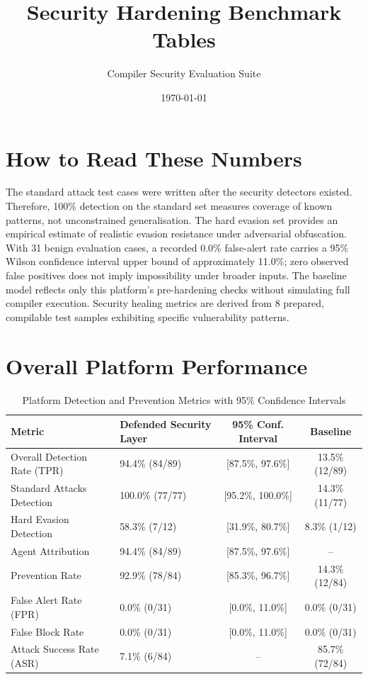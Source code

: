 \documentclass{article}
\title{Security Hardening Benchmark Tables}
\author{Compiler Security Evaluation Suite}
\date{\today}
\begin{document}
\maketitle

\section*{How to Read These Numbers}
\noindent
The standard attack test cases were written after the security detectors existed. Therefore, 100\% detection on the standard set measures coverage of known patterns, not unconstrained generalisation. The hard evasion set provides an empirical estimate of realistic evasion resistance under adversarial obfuscation. With 31 benign evaluation cases, a recorded 0.0\% false-alert rate carries a 95\% Wilson confidence interval upper bound of approximately 11.0\%; zero observed false positives does not imply impossibility under broader inputs. The baseline model reflects only this platform's pre-hardening checks without simulating full compiler execution. Security healing metrics are derived from 8 prepared, compilable test samples exhibiting specific vulnerability patterns.

\section{Overall Platform Performance}
\begin{table}[htbp]
\centering
\caption{Platform Detection and Prevention Metrics with 95\% Confidence Intervals}
\label{tab:headline}
\begin{tabularx}{\textwidth}{l X c c}
\toprule
\textbf{Metric} & \textbf{Defended Security Layer} & \textbf{95\% Conf. Interval} & \textbf{Baseline} \\
\midrule
Overall Detection Rate (TPR) & 94.4\% (84/89) & [87.5\%, 97.6\%] & 13.5\% (12/89) \\
Standard Attacks Detection & 100.0\% (77/77) & [95.2\%, 100.0\%] & 14.3\% (11/77) \\
Hard Evasion Detection & 58.3\% (7/12) & [31.9\%, 80.7\%] & 8.3\% (1/12) \\
Agent Attribution & 94.4\% (84/89) & [87.5\%, 97.6\%] & -- \\
Prevention Rate & 92.9\% (78/84) & [85.3\%, 96.7\%] & 14.3\% (12/84) \\
False Alert Rate (FPR) & 0.0\% (0/31) & [0.0\%, 11.0\%] & 0.0\% (0/31) \\
False Block Rate & 0.0\% (0/31) & [0.0\%, 11.0\%] & 0.0\% (0/31) \\
Attack Success Rate (ASR) & 7.1\% (6/84) & -- & 85.7\% (72/84) \\
\bottomrule
\end{tabularx}
\end{table}
\end{document}
